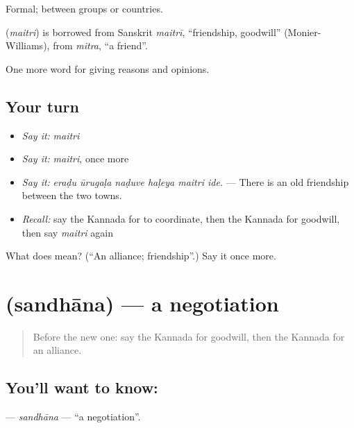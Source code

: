 Formal; between groups or countries.

\begin{cousinweb}
\textbf{} (\emph{maitri}) is borrowed from Sanskrit \emph{maitrī}, \textquotedblleft{}friendship, goodwill\textquotedblright{} (Monier-Williams), from \emph{mitra}, \textquotedblleft{}a friend\textquotedblright{}.
\end{cousinweb}

\begin{grammarlens}[title={What you've built}]
One more word for giving reasons and opinions.
\end{grammarlens}

\subsection*{Your turn}
\begin{itemize}
\raggedright
  \item \emph{Say it:} \emph{maitri}
  \item \emph{Say it:} \emph{maitri}, once more
  \item \emph{Say it:} \emph{eraḍu ūrugaḷa naḍuve haḷeya maitri ide.} — There is an old friendship between the two towns.
  \item \emph{Recall:} say the Kannada for to coordinate, then the Kannada for goodwill, then say \emph{maitri} again
\end{itemize}

\begin{tcolorbox}[breakable,colback=teal!4,colframe=teal!35!black,title={Before you move on}]
What does  mean? (\textquotedblleft{}An alliance; friendship\textquotedblright{}.) Say it once more.
\end{tcolorbox}
\section[\texorpdfstring{\kn{ಸಂಧಾನ} (sandhāna)}{ಸಂಧಾನ (sandhāna)}]{ (sandhāna) — a negotiation}

\label{lesson:KA-C405-sandhana}



\begin{quote}
Before the new one: say the Kannada for goodwill, then the Kannada for an alliance.
\end{quote}

\subsection*{You'll want to know: }
\textbf{} — \emph{sandhāna} — \textquotedblleft{}a negotiation\textquotedblright{}.

